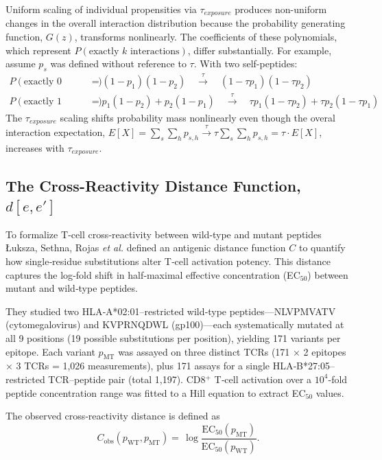 \documentclass[11pt]{article}
\begin{document}
Uniform scaling of individual propensities via \(\tau_{exposure}\) produces non-uniform changes in the overall interaction distribution because the probability generating function, \(G(z)\), transforms nonlinearly. The coefficients of these polynomials, which represent $P(\text{exactly } k \text{ interactions})$, differ substantially. For example, assume \(p_{s}\) was defined without reference to \(\tau\). With two self-peptides:
\begin{align}
P(\text{exactly 0 interactions}) &= (1-p_1)(1-p_2) \quad \xrightarrow{\tau} \quad (1-\tau p_1)(1-\tau p_2) \\
P(\text{exactly 1 interaction}) &= p_1(1-p_2) + p_2(1-p_1) \quad \xrightarrow{\tau} \quad \tau p_1(1-\tau p_2) + \tau p_2(1-\tau p_1)
\end{align}
The $\tau_{exposure}$ scaling shifts probability mass nonlinearly even though the overal interaction expectation, \( E[X] = \sum_s \sum_h p_{s,h} \xrightarrow{\tau} \tau \sum_s \sum_h p_{s,h} = \tau \cdot E[X] \), increases with $\tau_{exposure}$.

\subsection{The Cross-Reactivity Distance Function, $d[e,e']$} To formalize T‑cell cross‑reactivity between wild‑type and mutant peptides Łuksza, Sethna, Rojas \emph{et al.}\citep{luksza2022neoantigen} defined an antigenic distance function \(C\) to quantify how single‑residue substitutions alter T‑cell activation potency.  This distance captures the log‑fold shift in half‑maximal effective concentration (EC\(_{50}\)) between mutant and wild‑type peptides.

They studied two HLA‑A*02:01–restricted wild‑type peptides—NLVPMVATV (cytomegalovirus) and KVPRNQDWL (gp100)—each systematically mutated at all 9 positions (19 possible substitutions per position), yielding 171 variants per epitope.  Each variant \(p_{\mathrm{MT}}\) was assayed on three distinct TCRs (171 × 2 epitopes × 3 TCRs = 1,026 measurements), plus 171 assays for a single HLA‑B*27:05–restricted TCR–peptide pair (total 1,197).  CD8\(^+\) T‑cell activation over a \(10^4\)-fold peptide concentration range was fitted to a Hill equation to extract EC\(_{50}\) values.

The observed cross‑reactivity distance is defined as
\begin{equation}
\label{eq:cross-reactivity}
C_{\mathrm{obs}}(p_{\mathrm{WT}},p_{\mathrm{MT}})
=\,
\log\frac{\mathrm{EC}_{50}(p_{\mathrm{MT}})}{\mathrm{EC}_{50}(p_{\mathrm{WT}})}.
\end{equation}
\end{document}
